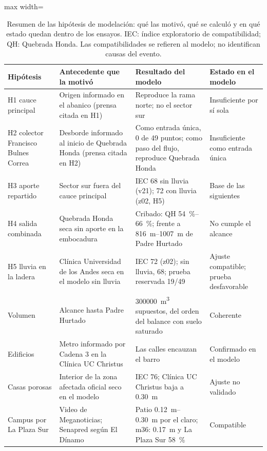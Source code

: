 \begin{table}[htbp]\centering\small
\caption{Resumen de las hipótesis de modelación: qué las motivó, qué se calculó y en qué estado quedan dentro de los ensayos. IEC: índice exploratorio de compatibilidad; QH: Quebrada Honda. Las compatibilidades se refieren al modelo; no identifican causas del evento.}\label{tab:recorrido}
\begin{adjustbox}{max width=\textwidth}\begin{tabular}{@{}>{\raggedright\arraybackslash}p{}>{\raggedright\arraybackslash}p{}>{\raggedright\arraybackslash}p{}>{\raggedright\arraybackslash}p{}@{}}\toprule
Hipótesis & Antecedente que la motivó & Resultado del modelo & Estado en el modelo\\\midrule
H1 cauce principal & Origen informado en el abanico (prensa citada en H1) & Reproduce la rama norte; no el sector sur & Insuficiente por sí sola\\
H2 colector Francisco Bulnes Correa & Desborde informado al inicio de Quebrada Honda (prensa citada en H2) & Como entrada única, 0 de 49 puntos; como paso del flujo, reproduce Quebrada Honda & Insuficiente como entrada única\\
H3 aporte repartido & Sector sur fuera del cauce principal & IEC 68 sin lluvia (v21); 72 con lluvia (z02, H5) & Base de las siguientes\\
H4 salida combinada & Quebrada Honda seca sin aporte en la embocadura & Cribado: QH \SIrange{54}{66}{\percent}; frente a \SIrange{816}{1007}{m} de Padre Hurtado & No cumple el alcance\\
H5 lluvia en la ladera & Clínica Universidad de los Andes seca en el modelo sin lluvia & IEC 72 (z02); sin lluvia, 68; prueba reservada 19/49 & Ajuste compatible; prueba desfavorable\\
Volumen & Alcance hasta Padre Hurtado & \SI{300000}{m^3} supuestos, del orden del balance con suelo saturado & Coherente\\
Edificios & Metro informado por Cadena 3 en la Clínica UC Christus & Las calles encauzan el barro & Confirmado en el modelo\\
Casas porosas & Interior de la zona afectada oficial seco en el modelo & IEC 76; Clínica UC Christus baja a \SI{0,30}{m} & Ajuste no validado\\
Campus por La Plaza Sur & Video de Meganoticias; Senapred según El Dínamo & Patio \SIrange{0,12}{0,30}{m} por el claro; m36: \SI{0,17}{m} y La Plaza Sur \SI{58}{\percent} & Compatible\\

\end{tabular}
\end{adjustbox}
\end{table}
